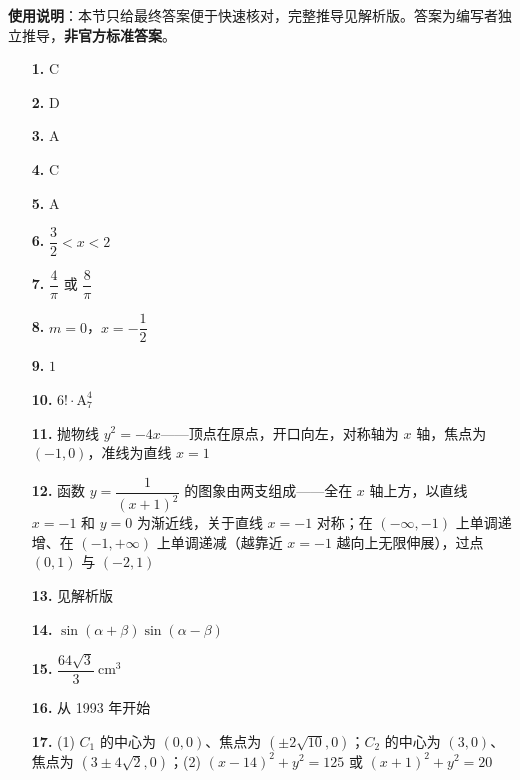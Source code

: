 
\begin{gknotice}
\textbf{使用说明}：本节只给最终答案便于快速核对，完整推导见解析版。答案为编写者独立推导，\textbf{非官方标准答案}。
\end{gknotice}

\begin{itemize}[leftmargin=2.6em]
  \item[\textbf{1.}] C
  \item[\textbf{2.}] D
  \item[\textbf{3.}] A
  \item[\textbf{4.}] C
  \item[\textbf{5.}] A
  \item[\textbf{6.}] $\dfrac32<x<2$
  \item[\textbf{7.}] $\dfrac4\pi$ 或 $\dfrac8\pi$
  \item[\textbf{8.}] $m=0$，$x=-\dfrac12$
  \item[\textbf{9.}] $1$
  \item[\textbf{10.}] $6!\cdot\mathrm A_7^4$
  \item[\textbf{11.}] 抛物线 $y^2=-4x$——顶点在原点，开口向左，对称轴为 $x$ 轴，焦点为 $(-1,0)$，准线为直线 $x=1$
  \item[\textbf{12.}] 函数 $y=\dfrac{1}{(x+1)^2}$ 的图象由两支组成——全在 $x$ 轴上方，以直线 $x=-1$ 和 $y=0$ 为渐近线，关于直线 $x=-1$ 对称；在 $(-\infty,-1)$ 上单调递增、在 $(-1,+\infty)$ 上单调递减（越靠近 $x=-1$ 越向上无限伸展），过点 $(0,1)$ 与 $(-2,1)$
  \item[\textbf{13.}] 见解析版
  \item[\textbf{14.}] $\sin(\alpha+\beta)\sin(\alpha-\beta)$
  \item[\textbf{15.}] $\dfrac{64\sqrt3}{3}\ \mathrm{cm}^3$
  \item[\textbf{16.}] 从 1993 年开始
  \item[\textbf{17.}] (1) $C_1$ 的中心为 $(0,0)$、焦点为 $(\pm2\sqrt{10},0)$；$C_2$ 的中心为 $(3,0)$、焦点为 $(3\pm4\sqrt2,0)$；(2) $(x-14)^2+y^2=125$ 或 $(x+1)^2+y^2=20$
\end{itemize}
